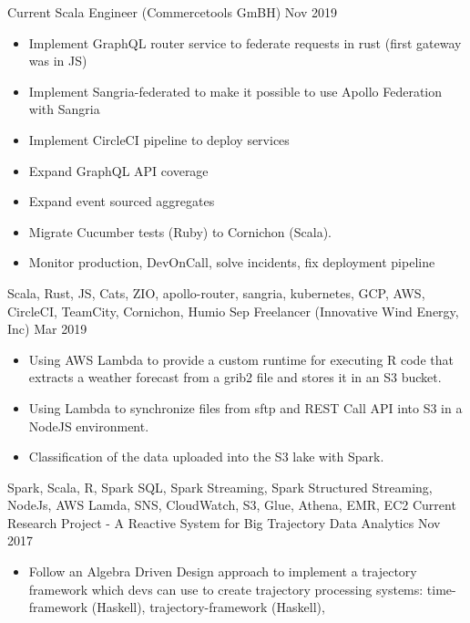 %
%
%
\begin{experiences}
  \experience
    {Current}   {Scala Engineer (Commercetools GmBH)}
    {Nov 2019} {
      \begin{itemize}
        \item Implement GraphQL router service to federate requests in rust (first gateway was in JS)
        \item Implement Sangria-federated to make it possible to use Apollo Federation with Sangria
        \item Implement CircleCI pipeline to deploy services
        \item Expand GraphQL API coverage
        \item Expand event sourced aggregates
        \item Migrate Cucumber tests (Ruby) to Cornichon (Scala).
        \item Monitor production, DevOnCall, solve incidents, fix deployment pipeline
      \end{itemize}
    }{Scala, Rust, JS, Cats, ZIO, apollo-router, sangria, kubernetes, GCP, AWS, CircleCI, TeamCity, Cornichon, Humio}
  \emptySeparator
  \experience
    {Sep}   {Freelancer (Innovative Wind Energy, Inc)}
    {Mar 2019} {
      \begin{itemize}
        \item Using AWS Lambda to provide a custom runtime for executing R code that extracts a weather forecast from a grib2 file and stores it in an S3 bucket.
        \item Using Lambda to synchronize files from sftp and REST Call API into S3 in a NodeJS environment.
        \item Classification of the data uploaded into the S3 lake with Spark.
      \end{itemize}
    }{Spark, Scala, R, Spark SQL, Spark Streaming, Spark Structured Streaming, NodeJs, AWS Lamda, SNS, CloudWatch, S3, Glue, Athena, EMR, EC2}
  \emptySeparator
  \experience
    {Current} {Research Project - A Reactive System for Big Trajectory Data Analytics}
    {Nov 2017}{
      \begin{itemize}
        \item Follow an Algebra Driven Design approach to implement a trajectory framework which devs can use to create trajectory processing systems: time-framework (Haskell), trajectory-framework (Haskell),

\end{itemize}}
\end{experiences}
